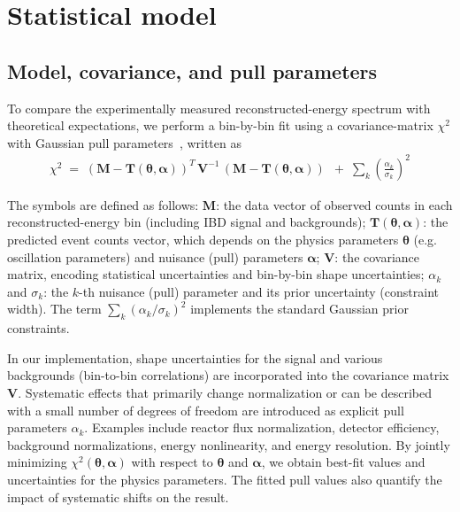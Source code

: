 \documentclass[xetex,twocolumn,epjc3]{svjour3}
\begin{document}
\section{Statistical model}
\label{sec:statistic analysis}

\subsection{Model, covariance, and pull parameters}
\label{sec:statistic method}
To compare the experimentally measured reconstructed-energy spectrum with theoretical expectations, we perform a bin-by-bin fit using a covariance-matrix $\chi^2$ with Gaussian pull parameters~\cite{Ji2019CombinedNC}, written as
\begin{equation}
    \begin{aligned}
\chi^2 \;=\; (\mathbf{M}-\mathbf{T}(\boldsymbol{\theta},\boldsymbol{\alpha}))^{T}\,\mathbf{V}^{-1}\,(\mathbf{M}-\mathbf{T}(\boldsymbol{\theta},\boldsymbol{\alpha})) \ \;+\; \sum_k\left(\frac{\alpha_k}{\sigma_k}\right)^2 
    \end{aligned}
\end{equation}

The symbols are defined as follows:
$\mathbf{M}$: the data vector of observed counts in each reconstructed-energy bin (including IBD signal and backgrounds);  
$\mathbf{T}(\boldsymbol{\theta},\boldsymbol{\alpha})$: the predicted event counts vector, which depends on the physics parameters $\boldsymbol{\theta}$ (e.g. oscillation parameters) and nuisance (pull) parameters $\boldsymbol{\alpha}$;  
$\mathbf{V}$: the covariance matrix, encoding statistical uncertainties and bin-by-bin shape uncertainties;  $\alpha_k$ and $\sigma_k$: the $k$-th nuisance (pull) parameter and its prior uncertainty (constraint width). The term $\sum_k(\alpha_k/\sigma_k)^2$ implements the standard Gaussian prior constraints.
    
In our implementation, shape uncertainties for the signal and various backgrounds (bin-to-bin correlations) are incorporated into the covariance matrix $\mathbf{V}$. Systematic effects that primarily change normalization or can be described with a small number of degrees of freedom are introduced as explicit pull parameters $\alpha_k$.
Examples include reactor flux normalization, detector efficiency, background normalizations, energy nonlinearity, and energy resolution. By jointly minimizing $\chi^2(\boldsymbol{\theta},\boldsymbol{\alpha})$ with respect to $\boldsymbol{\theta}$ and $\boldsymbol{\alpha}$, we obtain best-fit values and uncertainties for the physics parameters. The fitted pull values also quantify the impact of systematic shifts on the result.
\end{document}
